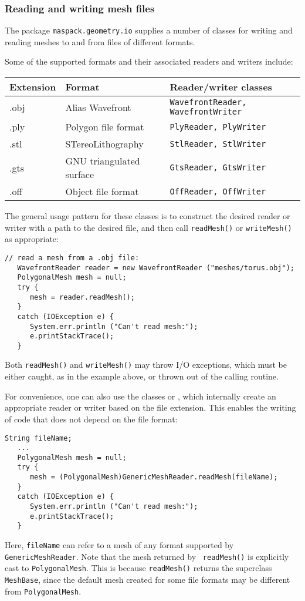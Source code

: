 \subsubsection{Reading and writing mesh files}
\label{MeshFileIO:sec}

The package {\tt maspack.geometry.io} supplies a number of classes for
writing and reading meshes to and from files of different formats.

Some of the supported formats and their associated readers and writers
include:

\begin{tabular}{|lll|}
\hline
Extension & Format & Reader/writer classes \\
\hline
.obj & Alias Wavefront & \tt WavefrontReader, WavefrontWriter \\
.ply & Polygon file format & \tt PlyReader, PlyWriter \\
.stl & STereoLithography & \tt StlReader, StlWriter \\
.gts & GNU triangulated surface & \tt GtsReader, GtsWriter \\
.off & Object file format & \tt OffReader, OffWriter \\
\hline
\end{tabular}

The general usage pattern for these classes is to construct the
desired reader or writer with a path to the desired file, and then
call {\tt readMesh()} or {\tt writeMesh()} as appropriate:
%
\begin{lstlisting}[]
   // read a mesh from a .obj file:
   WavefrontReader reader = new WavefrontReader ("meshes/torus.obj");
   PolygonalMesh mesh = null;
   try {
      mesh = reader.readMesh();
   }
   catch (IOException e) {
      System.err.println ("Can't read mesh:");
      e.printStackTrace();
   }
\end{lstlisting}
%
Both {\tt readMesh()} and {\tt writeMesh()} may throw I/O exceptions,
which must be either caught, as in the example above, or
thrown out of the calling routine.

For convenience, one can also use the classes
 or
, which internally
create an appropriate reader or writer based on the file
extension. This enables the writing of code
that does not depend on the file format:
%
\begin{lstlisting}[]
   String fileName;
   ...
   PolygonalMesh mesh = null;
   try {
      mesh = (PolygonalMesh)GenericMeshReader.readMesh(fileName);
   }
   catch (IOException e) {
      System.err.println ("Can't read mesh:");
      e.printStackTrace();
   }
\end{lstlisting}
%
Here, {\tt fileName} can refer to a mesh of any format supported by
{\tt GenericMeshReader}. Note that the mesh returned by {\tt
readMesh()} is explicitly cast to {\tt PolygonalMesh}.  This is
because {\tt readMesh()} returns the superclass {\tt MeshBase}, since
the default mesh created for some file formats may be different from
{\tt PolygonalMesh}.
